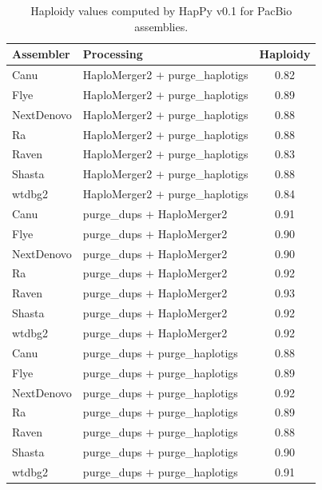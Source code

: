 \begin{suppsection}
\begin{table}[ht]
\centering
\caption{Haploidy values computed by HapPy v0.1 for PacBio assemblies.}
\begin{tabular}{llc}
\hline
\textbf{Assembler} & \textbf{Processing} & \textbf{Haploidy} \\
\hline
Canu & HaploMerger2 $+$ purge\_haplotigs & 0.82 \\
Flye & HaploMerger2 $+$ purge\_haplotigs & 0.89 \\
NextDenovo & HaploMerger2 $+$ purge\_haplotigs & 0.88 \\
Ra & HaploMerger2 $+$ purge\_haplotigs & 0.88 \\
Raven & HaploMerger2 $+$ purge\_haplotigs & 0.83 \\
Shasta & HaploMerger2 $+$ purge\_haplotigs & 0.88 \\
wtdbg2 & HaploMerger2 $+$ purge\_haplotigs & 0.84 \\
Canu & purge\_dups $+$ HaploMerger2 & 0.91 \\
Flye & purge\_dups $+$ HaploMerger2 & 0.90 \\
NextDenovo & purge\_dups $+$ HaploMerger2 & 0.90 \\
Ra & purge\_dups $+$ HaploMerger2 & 0.92 \\
Raven & purge\_dups $+$ HaploMerger2 & 0.93 \\
Shasta & purge\_dups $+$ HaploMerger2 & 0.92 \\
wtdbg2 & purge\_dups $+$ HaploMerger2 & 0.92 \\
Canu & purge\_dups $+$ purge\_haplotigs & 0.88 \\
Flye & purge\_dups $+$ purge\_haplotigs & 0.89 \\
NextDenovo & purge\_dups $+$ purge\_haplotigs & 0.92 \\
Ra & purge\_dups $+$ purge\_haplotigs & 0.89 \\
Raven & purge\_dups $+$ purge\_haplotigs & 0.88 \\
Shasta & purge\_dups $+$ purge\_haplotigs & 0.90 \\
wtdbg2 & purge\_dups $+$ purge\_haplotigs & 0.91 \\
\hline
\end{tabular}
\label{tab:pacbio_happy_part3}
\end{table}


\end{suppsection}
